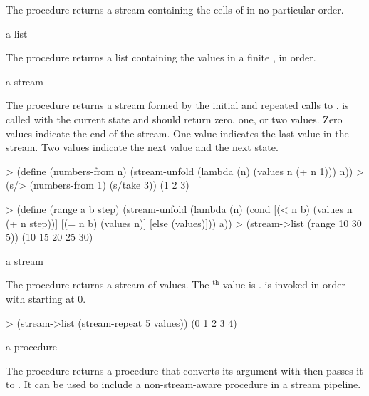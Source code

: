 The  procedure returns a stream containing the cells of
 in no particular order.

\begin{procedure}
\end{procedure}
\returns{} a list

The  procedure returns a list containing the values in a finite
, in order.

\begin{procedure}
\end{procedure}
\returns{} a stream

The  procedure returns a stream formed by the initial  and
repeated calls to .  is called with the current state and
should return zero, one, or two values. Zero values indicate the end of the stream. One
value indicates the last value in the stream. Two values indicate the next value and the
next state.

\codebegin
> (define (numbers-from n)
    (stream-unfold (lambda (n) (values n (+ n 1))) n))
> (s/> (numbers-from 1) (s/take 3))
(1 2 3)
\codeend

\codebegin
> (define (range a b step)
    (stream-unfold
     (lambda (n)
       (cond
        [(< n b) (values n (+ n step))]
        [(= n b) (values n)]
        [else (values)]))
     a))
> (stream->list (range 10 30 5))
(10 15 20 25 30)
\codeend

\begin{procedure}
\end{procedure}
\returns{} a stream

The  procedure returns a stream of  values. The
$^\textrm{th}$ value is .  is invoked in
order with  starting at 0.

\codebegin
> (stream->list (stream-repeat 5 values))
(0 1 2 3 4)
\codeend

\begin{procedure}
\end{procedure}
\returns{} a procedure

The  procedure returns a procedure that converts its argument with
 then passes it to . It can be used to include a non-stream-aware
procedure in a stream pipeline.

